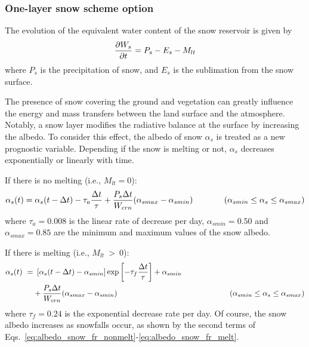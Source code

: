 \subsubsection{One-layer snow scheme option}
\label{sec:one_layer_snow_hydro}

The evolution of the equivalent water content of the snow reservoir
is given by
\begin{eqnarray}
{\partial W_s \over \partial t} = P_s - E_s - M_{lt}
\end{eqnarray}
where $P_s$ is the precipitation of snow, and $E_s$ is the sublimation
from the snow surface.

The presence of snow covering the ground and
vegetation can greatly influence the energy and mass
transfers between the land surface and the atmosphere.
Notably, a snow layer modifies the radiative
balance at the surface by increasing the albedo.
To consider this effect, the albedo of snow $\alpha_s$ is treated
as a new prognostic variable.
Depending if the snow is melting or not,
$\alpha_s$ decreases
exponentially or linearly with time.

If there is no melting (i.e., $M_{lt}=0$):
%
\begin{equation}
\label{eq:albedo_snow_fr_nonmelt}
\alpha_s (t) = \alpha_s (t-\Delta t) - \tau_a {\Delta t \over \tau}
+ { P_s \Delta t \over W_{crn} } ( \alpha_{smax} - \alpha_{smin} ) 
\hskip.5in
\left(\alpha_{smin} \leq \alpha_s \leq \alpha_{smax}\right)
\end{equation}
%
where $\tau_a=0.008$ is the linear rate of decrease per day,
$\alpha_{smin}=0.50$
and $\alpha_{smax}=0.85$ are the minimum and maximum values of the snow
albedo.

If there is melting (i.e., $M_{lt} \ > \ 0$):
%
\begin{align}
\label{eq:albedo_snow_fr_melt}
\begin{split}
\alpha_s (t) \,\, =& \,\,  \left[ \alpha_s(t - \Delta t) - \alpha_{smin} \right]
\exp \left[ -\tau_f {\Delta t \over \tau } \right]
+ \alpha_{smin} \\
& + { P_s \Delta t \over W_{crn} } ( \alpha_{smax} - \alpha_{smin} ) 
\hskip2.in
\left(\alpha_{smin} \leq \alpha_s \leq \alpha_{smax}\right)
\end{split}
\end{align}
%
where $\tau_f=0.24$ is the exponential decrease rate per day.
Of course, the snow albedo increases as snowfalls occur, as shown
by the second terms of Eqs.~\ref{eq:albedo_snow_fr_nonmelt}-\ref{eq:albedo_snow_fr_melt}.

